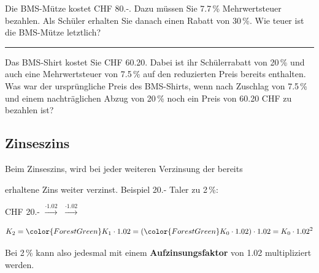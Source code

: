 \newpage
Die BMS-Mütze kostet CHF 80.-. Dazu müssen Sie 7.7\,\%
Mehrwertsteuer bezahlen. Als Schüler erhalten Sie danach einen Rabatt von
30\,\%. Wie teuer ist die BMS-Mütze letztlich?


\hrule

Das BMS-Shirt kostet Sie CHF 60.20. Dabei ist ihr Schülerrabatt von
20\,\% und auch eine Mehrwertsteuer von 7.5\,\% auf den reduzierten Preis bereits enthalten.
Was war der ursprüngliche Preis des BMS-Shirts, wenn nach Zuschlag von
7.5\,\% und einem nachträglichen Abzug von 20\,\% noch ein Preis von 60.20 CHF zu bezahlen
ist?

\newpage



\subsection{Zinseszins}


Beim Zinseszins, wird bei jeder weiteren Verzinsung der bereits

erhaltene Zins weiter verzinst. Beispiel 20.- Taler zu 2\,\%:

CHF 20.- $\stackrel{\cdot{}1.02}{\longrightarrow}$  $\stackrel{\cdot{}1.02}{\longrightarrow}$ 

$$K_2 = {\color{ForestGreen}K_1}\cdot{}1.02 = ({\color{ForestGreen}K_0\cdot{}1.02})\cdot{}1.02 = K_0\cdot{}1.02^2$$

Bei 2\,\% kann also jedesmal mit einem \textbf{Aufzinsungsfaktor} von
1.02 multipliziert werden.



